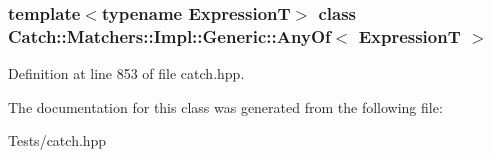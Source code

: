 \subsubsection*{template$<$typename ExpressionT$>$\newline
class Catch\+::\+Matchers\+::\+Impl\+::\+Generic\+::\+Any\+Of$<$ Expression\+T $>$}



Definition at line 853 of file catch.\+hpp.



The documentation for this class was generated from the following file\+:\begin{DoxyCompactItemize}
\item 
Tests/catch.\+hpp\end{DoxyCompactItemize}
